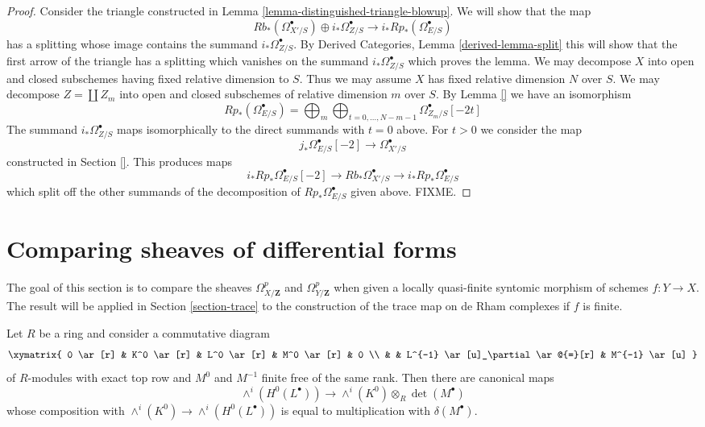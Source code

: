 \begin{proof}
Consider the triangle constructed in
Lemma \ref{lemma-distinguished-triangle-blowup}.
We will show that the map
$$
Rb_*(\Omega^\bullet_{X'/S}) \oplus i_*\Omega^\bullet_{Z/S} \to
i_*Rp_*(\Omega^\bullet_{E/S})
$$
has a splitting whose image contains the summand $i_*\Omega^\bullet_{Z/S}$.
By Derived Categories, Lemma \ref{derived-lemma-split} this will show that
the first arrow of the triangle has a splitting which vanishes on
the summand $i_*\Omega^\bullet_{Z/S}$ which proves the lemma.
We may decompose $X$ into open and closed subschemes
having fixed relative dimension to $S$. Thus we may assume $X$ has
fixed relative dimension $N$ over $S$. We may decompose
$Z = \coprod Z_m$ into open and closed subschemes of relative
dimension $m$ over $S$.
By Lemma \ref{} we have an isomorphism
$$
Rp_*(\Omega^\bullet_{E/S}) =
\bigoplus\nolimits_m
\bigoplus\nolimits_{t = 0, \ldots, N - m - 1}
\Omega^\bullet_{Z_m/S}[-2t]
$$
The summand $i_*\Omega^\bullet_{Z/S}$ maps isomorphically to
the direct summands with $t = 0$ above. For $t > 0$ we consider
the map
$$
j_*\Omega^\bullet_{E/S}[-2] \longrightarrow \Omega^\bullet_{X'/S}
$$
constructed in Section \ref{}. This produces maps
$$
i_*Rp_*\Omega^\bullet_{E/S}[-2] \to
Rb_*\Omega^\bullet_{X'/S} \to
i_*Rp_*\Omega^\bullet_{E/S}
$$
which split off the other summands of the decomposition
of $Rp_*\Omega^\bullet_{E/S}$ given above. FIXME.
\end{proof}















\section{Comparing sheaves of differential forms}
\label{section-quasi-finite-syntomic}

\noindent
The goal of this section is to compare the sheaves
$\Omega^p_{X/\mathbf{Z}}$ and $\Omega^p_{Y/\mathbf{Z}}$
when given a locally quasi-finite syntomic morphism of schemes $f : Y \to X$.
The result will be applied in Section \ref{section-trace}
to the construction of the trace map on de Rham complexes if $f$ is finite.

\begin{lemma}
\label{lemma-funny-map}
Let $R$ be a ring and consider a commutative diagram
$$
\xymatrix{
0 \ar[r] &
K^0 \ar[r] &
L^0 \ar[r] &
M^0 \ar[r] & 0 \\
& & L^{-1} \ar[u]_\partial \ar@{=}[r] &
M^{-1} \ar[u]
}
$$
of $R$-modules with exact top row and $M^0$ and $M^{-1}$
finite free of the same rank. Then there are canonical maps
$$
\wedge^i(H^0(L^\bullet)) \longrightarrow \wedge^i(K^0) \otimes_R \det(M^\bullet)
$$
whose composition with $\wedge^i(K^0) \to \wedge^i(H^0(L^\bullet))$
is equal to multiplication with $\delta(M^\bullet)$.
\end{lemma}

